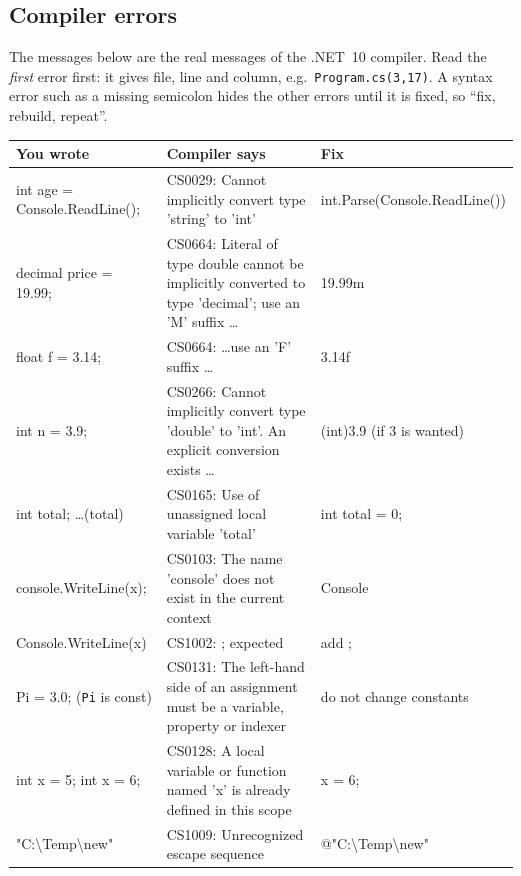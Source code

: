 \subsection{Compiler errors}
The messages below are the real messages of the .NET~10 compiler. Read the \emph{first} error first: it gives file, line and column, e.g.\ \texttt{Program.cs(3,17)}. A syntax error such as a missing semicolon hides the other errors until it is fixed, so ``fix, rebuild, repeat''.
\begin{center}\footnotesize
\begin{tabularx}{\linewidth}{>{\ttfamily\raggedright\arraybackslash}p{37mm} >{\raggedright\arraybackslash}X >{\ttfamily\raggedright\arraybackslash}p{47mm}}
\toprule
\normalfont\textbf{You wrote} & \textbf{Compiler says} & \normalfont\textbf{Fix}\\ \midrule
int age = Console.ReadLine(); & CS0029: Cannot implicitly convert type 'string' to 'int' & int.Parse(Console.ReadLine())\\
decimal price = 19.99; & CS0664: Literal of type double cannot be implicitly converted to type 'decimal'; use an 'M' suffix \dots & 19.99m\\
float f = 3.14; & CS0664: \dots use an 'F' suffix \dots & 3.14f\\
int n = 3.9; & CS0266: Cannot implicitly convert type 'double' to 'int'. An explicit conversion exists \dots & (int)3.9 \normalfont(if 3 is wanted)\\
int total; \dots (total) & CS0165: Use of unassigned local variable 'total' & int total = 0;\\
console.WriteLine(x); & CS0103: The name 'console' does not exist in the current context & Console\\
Console.WriteLine(x) & CS1002: ; expected & add ;\\
Pi = 3.0; \normalfont(\texttt{Pi} is const) & CS0131: The left-hand side of an assignment must be a variable, property or indexer & \normalfont do not change constants\\
int x = 5; int x = 6; & CS0128: A local variable or function named 'x' is already defined in this scope & x = 6;\\
"C:\textbackslash Temp\textbackslash new" & CS1009: Unrecognized escape sequence & @"C:\textbackslash Temp\textbackslash new"\\ \bottomrule
\end{tabularx}
\end{center}

